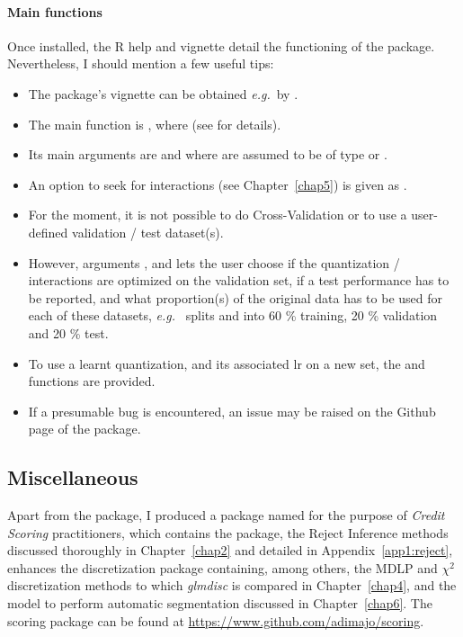 \paragraph{Main functions}

Once installed, the \textsf{R} help and vignette detail the functioning of the package. Nevertheless, I should mention a few useful tips:

\begin{itemize}
\item The package's vignette can be obtained \textit{e.g.}\ by .
\item The main function is , where (see  for details).
\item Its main arguments are  and  where  are assumed to be of type  or .
\item An option to seek for interactions (see Chapter~\ref{chap5}) is given as .
\item For the moment, it is not possible to do Cross-Validation or to use a user-defined validation / test dataset(s).
\item However, arguments ,  and  lets the user choose if the quantization / interactions are optimized on the validation set, if a test performance has to be reported, and what proportion(s) of the original data has to be used for each of these datasets, \textit{e.g.}\  splits  and  into 60 \% training, 20 \% validation and 20 \% test.
\item To use a learnt quantization, and its associated \gls{lr} on a new set, the  and  functions are provided.
\item If a presumable bug is encountered, an issue may be raised on the Github page of the package.
\end{itemize}

\subsection{Miscellaneous}

Apart from the  package, I produced a package named  for the purpose of \textit{Credit Scoring} practitioners, which contains the  package, the Reject Inference methods discussed thoroughly in Chapter~\ref{chap2} and detailed in Appendix~\ref{app1:reject}, enhances the discretization package containing, among others, the MDLP and $\chi^2$ discretization methods to which \textit{glmdisc} is compared in Chapter~\ref{chap4}, and the model to perform automatic segmentation discussed in Chapter~\ref{chap6}. The scoring package can be found at \url{https://www.github.com/adimajo/scoring}.


